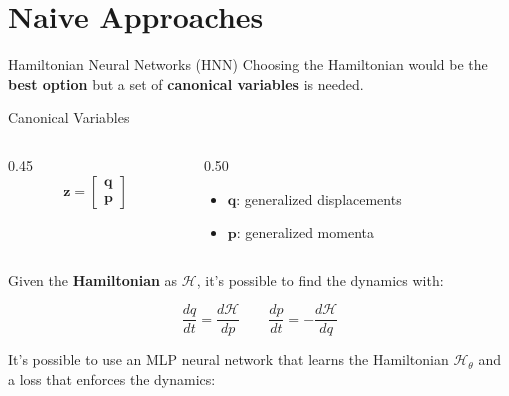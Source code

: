 \section{Naive Approaches}


\begin{frame}{Hamiltonian Neural Networks (HNN)}
    Choosing the Hamiltonian would be the \textbf{best option} but a set of \textbf{canonical variables} is needed.
    
    \begin{block}{Canonical Variables}
        \begin{columns}[c] %
            
            \begin{column}{0.45\textwidth}
                \[
                    \mathbf{z} = 
                    \begin{bmatrix}
                        \mathbf{q} \\
                        \mathbf{p}
                    \end{bmatrix}
                \]
            \end{column}

            \begin{column}{0.50\textwidth}
                \begin{itemize}
                    \item $\mathbf{q}$: generalized displacements
                    \item $\mathbf{p}$: generalized momenta
                \end{itemize}
            \end{column}
            
        \end{columns}
    \end{block}

    Given the \textbf{Hamiltonian} as $\mathcal{H}$, it's possible to find the dynamics with: 

    $$\frac{dq}{dt} = \frac{d\mathcal{H}}{dp} \hspace{2em} \frac{dp}{dt} = -\frac{d\mathcal{H}}{dq}$$
    
    It's possible to use an MLP neural network that learns the Hamiltonian $\mathcal{H}_\theta$ and a loss that enforces the dynamics: 


\end{frame}
